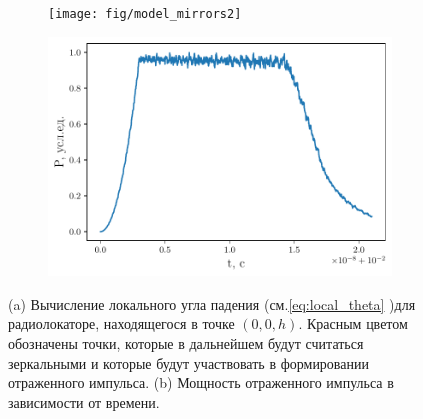  \begin{figure}[H]
     \begin{subfigure}{.59\linewidth}
         \centering
         \texttt{[image: fig/model\_mirrors2]}
         \caption{}
     \end{subfigure}
     \begin{subfigure}{.39\linewidth}
         \centering
         \includegraphics[width=\linewidth]{fig/model_impuls2}
         \caption{}
     \end{subfigure}
     \caption{(a) Вычисление локального угла падения (см.\eqref{eq:local_theta} )для радиолокаторе,
     находящегося в точке $(0,0,h)$. Красным цветом обозначены точки, которые в
 дальнейшем будут считаться зеркальными и которые будут участвовать в
 формировании отраженного импульса.
 (b) Мощность отраженного импульса в зависимости от времени.}
 \label{fig:flat_surf}
 \end{figure}


